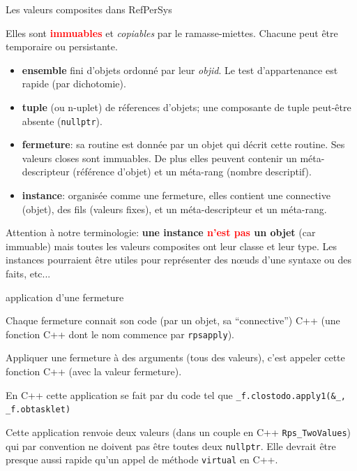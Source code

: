 \documentclass[final,a4,xcolor={svgnames,dvipsnames}]{beamer}
\begin{document}
 \begin{frame}{Les valeurs composites dans RefPerSys}

   Elles sont \textbf{\textcolor{red}{immuables}} et
   \textit{copiables} par le ramasse-miettes. Chacune peut être
   temporaire ou persistante.

   \begin{relsize}{-0.5}
   \begin{itemize}
     \item \textbf{ensemble} fini d'objets ordonné par leur \textit{objid}. Le
       test d'appartenance est rapide (par dichotomie).
     \item \textbf{tuple} (ou n-uplet) de réferences d'objets; une composante
         de tuple peut-être absente (\texttt{nullptr}).
       \item \textbf{fermeture}: sa routine est donnée par un objet
           qui décrit cette routine. Ses valeurs closes sont
           immuables. De plus elles peuvent contenir un méta-descripteur (référence d'objet) et un méta-rang (nombre descriptif).
           \item \textbf{instance}: organisée comme une fermeture,
             elles contient une connective (objet), des fils
             (valeurs fixes), et un méta-descripteur et un méta-rang.
   \end{itemize}


   Attention à notre terminologie: \textbf{une instance
     \textcolor{red}{n'est pas} un objet} (car immuable) mais toutes
   les valeurs composites ont leur classe et leur type. Les instances
   pourraient être utiles pour représenter des n{\oe}uds d'une syntaxe
   ou des faits, etc...
   \end{relsize}
 \end{frame}

 \begin{frame}{application d'une fermeture}
   
   Chaque fermeture connait son code (par un objet, sa ``connective'')
   C++ (une fonction C++ dont le nom commence par \texttt{rpsapply}).

   \bigskip
   
   Appliquer une fermeture à des arguments (tous des valeurs), c'est
   appeler cette fonction C++ (avec la valeur fermeture).

   \bigskip
   
   En C++ cette application se fait par du code tel que \texttt{\_f.clostodo.apply1(\&\_, \_f.obtasklet)}

   \bigskip

   Cette application renvoie deux valeurs (dans un couple en C++
   \texttt{Rps\_TwoValues}) qui par convention ne doivent pas être
   toutes deux \texttt{nullptr}. Elle devrait être presque aussi
   rapide qu'un appel de méthode \texttt{virtual} en C++.
   
 \end{frame}
 
\end{document}
